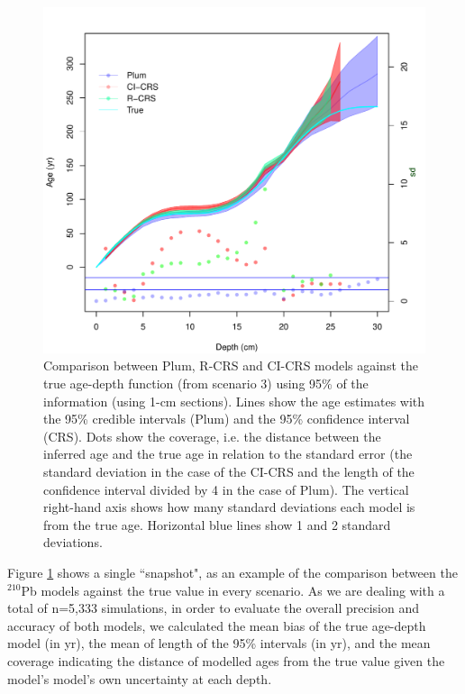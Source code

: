 \documentclass [10pt] {article}
\begin{document}
\begin{figure}[!]
	\centering
	\includegraphics[width=\linewidth]{95Comparison.pdf}
		\caption{Comparison between Plum, R-CRS and CI-CRS models against the true age-depth function (from scenario 3) using 95\% of the information (using 1-cm sections). Lines show the age estimates with the 95\% credible intervals (Plum) and the 95\% confidence interval (CRS). Dots show the coverage, i.e. the distance between the inferred age and the true age in relation to the standard error (the standard deviation in the case of the CI-CRS and the length of the confidence interval divided by 4 in the case of Plum). The vertical right-hand axis shows how many standard deviations each model is from the true age. Horizontal blue lines show 1 and 2 standard deviations.  }
		\label{fig:comparison1r}
\end{figure}

Figure \ref{fig:comparison1r} shows a single ``snapshot", as an example of the comparison between the $^{210}$Pb models against the true value in every scenario. 
As we are dealing with a total of n=5,333 simulations, in order to evaluate the overall precision and accuracy of both models, we calculated the mean bias of the true age-depth model (in yr), the mean of length of the 95\% intervals (in yr), and the mean coverage indicating the distance of modelled ages from the true value given the model’s model's own uncertainty at each depth.
\end{document}
